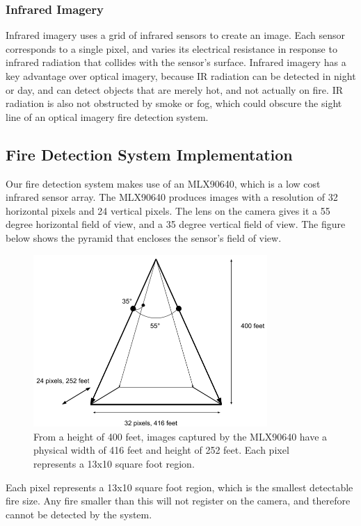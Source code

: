 \documentclass[12pt,journal,compsoc]{IEEEtran}
\begin{document}
\subsubsection{Infrared Imagery}
Infrared imagery uses a grid of infrared sensors to create an image. Each sensor corresponds to a single pixel, and 
varies its electrical resistance in response to infrared radiation that collides with the sensor's surface. Infrared imagery has a 
key advantage over optical imagery, because IR radiation can be detected in night or day, and can detect objects that are merely hot, and not actually on fire. IR radiation is also not obstructed by smoke or fog, which could obscure the sight line of an
optical imagery fire detection system.

\subsection{Fire Detection System Implementation}
Our fire detection system makes use of an MLX90640, which is a low cost infrared sensor array. The MLX90640
produces images with a resolution of 32 horizontal pixels and 24 vertical pixels. The lens on the camera 
gives it a 55 degree horizontal field of view, and a 35 degree vertical field of view. The figure below
shows the pyramid that encloses the sensor's field of view. 

\begin{figure}[h]
\centering
\includegraphics[width=3.5in]{mlx90640_fov.png}
\caption{From a height of 400 feet, images captured by the MLX90640 have a physical width of 416 feet and height of 252 feet.
Each pixel represents a 13x10 square foot region.}
\end{figure}

Each pixel represents a 13x10 square foot region, which is the smallest detectable fire size. Any fire smaller than this 
will not register on the camera, and therefore cannot be detected by the system.
\end{document}
